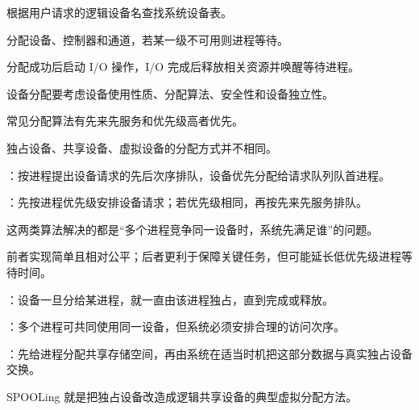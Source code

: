\begin{points}
  \item 根据用户请求的逻辑设备名查找系统设备表。
  \item 分配设备、控制器和通道，若某一级不可用则进程等待。
  \item 分配成功后启动 I/O 操作，I/O 完成后释放相关资源并唤醒等待进程。
\end{points}


\begin{points}
  \item 设备分配要考虑设备使用性质、分配算法、安全性和设备独立性。
  \item 常见分配算法有先来先服务和优先级高者优先。
  \item 独占设备、共享设备、虚拟设备的分配方式并不相同。
\end{points}

\begin{points}
  \item {}：按进程提出设备请求的先后次序排队，设备优先分配给请求队列队首进程。
  \item {}：先按进程优先级安排设备请求；若优先级相同，再按先来先服务排队。
  \item 这两类算法解决的都是“多个进程竞争同一设备时，系统先满足谁”的问题。
  \item 前者实现简单且相对公平；后者更利于保障关键任务，但可能延长低优先级进程等待时间。
\end{points}


\begin{points}
  \item {}：设备一旦分给某进程，就一直由该进程独占，直到完成或释放。
  \item {}：多个进程可共同使用同一设备，但系统必须安排合理的访问次序。
  \item {}：先给进程分配共享存储空间，再由系统在适当时机把这部分数据与真实独占设备交换。
  \item SPOOLing 就是把独占设备改造成逻辑共享设备的典型虚拟分配方法。
\end{points}


